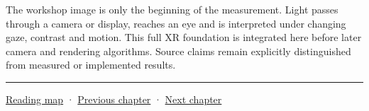 The workshop image is only the beginning of the measurement. Light passes through a camera or display, reaches an eye and is interpreted under changing gaze, contrast and motion. This full XR foundation is integrated here before later camera and rendering algorithms. Source claims remain explicitly distinguished from measured or implemented results.

\begin{center}\rule{0.5\linewidth}{0.5pt}\end{center}

\href{Chapter\%20Edition/02\%20-\%20Graphics\%20Vision\%20and\%20XR/00\%20-\%20Reading\%20Map}{Reading map} · \hyperref[04-visual-computing-ii-ch040]{Previous chapter} · \hyperref[04-visual-computing-ii-ch042]{Next chapter}
